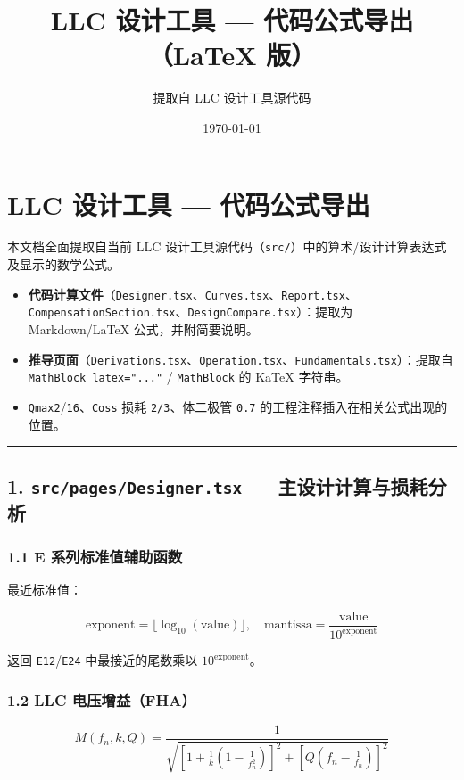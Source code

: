 \documentclass[UTF8]{ctexart}
\title{\Huge LLC 设计工具 — 代码公式导出（LaTeX 版）}
\author{提取自 LLC 设计工具源代码}
\date{\today}
\begin{document}
\maketitle

\section*{LLC 设计工具 — 代码公式导出}

本文档全面提取自当前 LLC 设计工具源代码（\texttt{src/}）中的算术/设计计算表达式及显示的数学公式。

\begin{itemize}
\item \textbf{代码计算文件}（\texttt{Designer.tsx}、\texttt{Curves.tsx}、\texttt{Report.tsx}、\texttt{CompensationSection.tsx}、\texttt{DesignCompare.tsx}）：提取为 Markdown/LaTeX 公式，并附简要说明。
\item \textbf{推导页面}（\texttt{Derivations.tsx}、\texttt{Operation.tsx}、\texttt{Fundamentals.tsx}）：提取自 \texttt{MathBlock latex="..."} / \texttt{MathBlock} 的 KaTeX 字符串。
\item \texttt{Qmax2}/\texttt{16}、\texttt{Coss} 损耗 \texttt{2/3}、体二极管 \texttt{0.7} 的工程注释插入在相关公式出现的位置。
\end{itemize}

\noindent\rule{\textwidth}{0.4pt}

\subsection*{1. \texttt{src/pages/Designer.tsx} — 主设计计算与损耗分析}

\subsubsection*{1.1 E 系列标准值辅助函数}

最近标准值：

\[
\text{exponent} = \lfloor \log_{10}(\text{value}) \rfloor,\quad
\text{mantissa} = \frac{\text{value}}{10^{\text{exponent}}}
\]

返回 \texttt{E12}/\texttt{E24} 中最接近的尾数乘以 \(10^{\text{exponent}}\)。

\subsubsection*{1.2 LLC 电压增益（FHA）}

\[
M(f_n,k,Q) = \frac{1}{\sqrt{\left[1 + \frac{1}{k}\left(1 - \frac{1}{f_n^{2}}\right)\right]^{2} + \left[Q\left(f_n - \frac{1}{f_n}\right)\right]^{2}}}
\]
\end{document}
